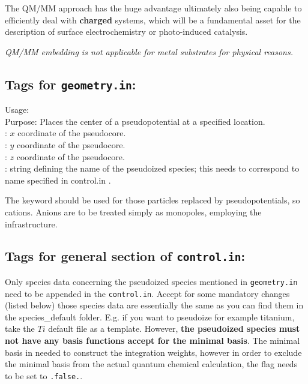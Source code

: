  
The QM/MM approach has the huge advantage ultimately also being capable to efficiently 
deal with \textbf{charged} systems, which will be a fundamental asset for the 
description of surface electrochemistry or photo-induced catalysis.


\emph{QM/MM embedding is not applicable for metal substrates for physical reasons.}




\newpage

\subsection*{Tags for \texttt{geometry.in}:}


{
  \noindent
  Usage:    
     \\[1.0ex] 
  Purpose: Places the center of a pseudopotential at a
    specified location. \\[1.0ex]
   : $x$ coordinate of the pseudocore. \\
   : $y$ coordinate of the pseudocore. \\
   : $z$ coordinate of the pseudocore. \\
   : string defining the name of the pseudoized species; this needs to correspond to name specified in control.in . \\
}

The keyword  should be used for those particles
replaced by pseudopotentials, so cations. Anions are to be treated simply
as monopoles, employing the  infrastructure.

% 

\subsection*{Tags for general section of \texttt{control.in}:}

Only species data concerning the pseudoized species mentioned in \texttt{geometry.in} 
need to be appended in the \texttt{control.in}.
Accept for some mandatory changes (listed below) those species data are essentially the same 
as you can find them in the species\_default folder. E.g. if you want to pseudoize for example titanium, 
take the $Ti$ default file as a template. However, \textbf{the pseudoized species must not have any basis functions 
accept for the minimal basis}. The minimal basis in needed to construct the integration weights, however in order 
to exclude the minimal basis from the actual quantum chemical calculation, the flag 
 needs to be set to \texttt{.false.}.


